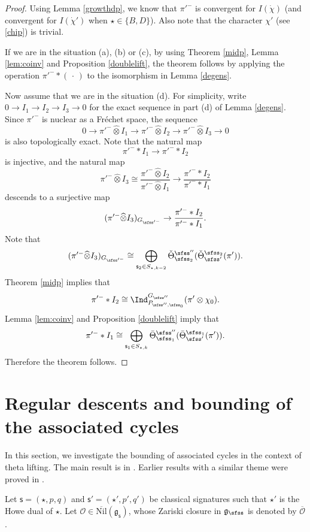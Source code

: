 \documentclass[11pt,a4paper]{amsart}
\newcommand{\CO}{{\mathcal {O}}}
\newcommand{\g}{\mathfrak g}
\numberwithin{equation}{section}
\theoremstyle{remark}
\def\Nil{\overline{\mathrm{Nil}}}
\def\Thetab{\bar{\Theta}}
\def\totimes{\widehat{\otimes}}
\begin{document}
\begin{proof}
Using Lemma \ref{growthdp}, we know that $\pi'^-$ is convergent for $I(\dot \chi)$ (and convergent for $I(\dot \chi')$ when $\star\in \{B,D\}$). Also note that the character $\chi'$ (see \eqref{chip}) is trivial.

If we are in the situation (a), (b) or (c), by using Theorem \ref{midp}, Lemma \ref{lem:coinv} and Proposition \ref{doublelift}, the theorem follows by applying the operation $\pi'^-*(\,\cdot\,)$ to the isomorphism in Lemma \ref{degens}.

Now assume that we are in the situation (d).
For simplicity, write $0\rightarrow I_1\rightarrow I_2\rightarrow I_3\rightarrow
0$ for the exact sequence in part (d) of Lemma \ref{degens}. Since $\pi'^-$ is nuclear as a Fr\'echet space, the sequence
\[
0\rightarrow \pi'^-\totimes I_1\rightarrow \pi'^-\totimes I_2\rightarrow \pi'^-\totimes I_3\rightarrow
0
\]
is also topologically exact.
Note that the natural map
\[
\pi'^- * I_1\rightarrow \pi'^- * I_2
\]
is injective, and the natural map
\[
  \pi'^-\totimes I_3\cong \frac{\pi'^-\totimes I_2}{\pi'^- \totimes I_1}\longrightarrow\frac{ \pi'^-*I_2}{\pi'^-*I_1}
  \]
descends to a surjective map
\[
  (\pi'^-\totimes  I_3)_{G_{\sfss'^-}}\rightarrow \frac{ \pi'^-*I_2}{\pi'^-*I_1}.
\]
Note that
\[
   (\pi'^-\totimes  I_3)_{G_{\sfss'^-}}\cong \bigoplus_{\mathsf s_2\in S_{\star, k-2}} \check \Theta^{\sfss''}_{\sfss_2}(\check \Theta^{\sfss_2}_{\sfss'}(\pi')).
\]
Theorem \ref{midp} implies that
\[
\pi'^-*I_2\cong \Ind_{P_{\sfss'',\sfss_0}}^{G_{\sfss''}} (\pi'\otimes \chi_0).
\]
Lemma \ref{lem:coinv} and Proposition \ref{doublelift} imply that
\[
\pi'^-*I_1\cong  \bigoplus_{\mathsf s_1\in S_{\star, k} } \Thetab^{\sfss''}_{\sfss_1}(\Thetab^{\sfss_1}_{\sfss'}(\pi')).
\]
Therefore the theorem follows.
\end{proof}

\section{Regular descents and bounding of the associated cycles}\label{sec:AC}

In this section, we investigate the bounding of associated cycles in the context of theta lifting. The main result is in . Earlier results with a similar theme were proved in \cites{NOT, NZ, LM}. 

Let $\mathsf s=(\star, p,q)$ and $ \mathsf s'=(\star', p',q')$ be classical signatures such that $\star'$ is the Howe dual of $\star$.
Let $\CO\in \Nil(\g_\mathsf s)$, whose Zariski closure in $\g_\sfss$ is denoted by $\overline \CO$.
\end{document}
